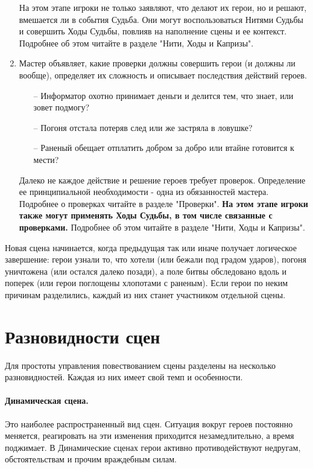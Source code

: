 \begin{enumerate}
\begin{itemize}
\end{itemize}
На этом этапе игроки не только заявляют, что делают их герои, но и решают, вмешается ли в события Судьба. Они могут воспользоваться Нитями Судьбы и совершить Ходы Судьбы, повлияв на наполнение сцены и ее контекст. Подробнее об этом читайте в разделе "Нити, Ходы и Капризы".
\item Мастер объявляет, какие проверки должны совершить герои (и должны ли вообще), определяет их сложность и описывает последствия действий героев.
\begin{itemize}
\item[--] Информатор охотно принимает деньги и делится тем, что знает, или зовет подмогу?
\item[--]  Погоня отстала потеряв след или же застряла в ловушке?
\item[--]  Раненый обещает отплатить добром за добро или втайне готовится к мести?
\end{itemize}
Далеко не каждое действие и решение героев требует проверок. Определение ее принципиальной необходимости - одна из обязанностей мастера. Подробнее о проверках читайте в разделе "Проверки".
\linebreak \textbf{На этом этапе игроки также могут применять Ходы Судьбы, в том числе связанные с проверками.} Подробнее об этом читайте в разделе "Нити, Ходы и Капризы".
\end{enumerate}
Новая сцена начинается, когда предыдущая так или иначе получает логическое завершение: герои узнали  то, что хотели (или бежали под градом ударов), погоня уничтожена (или остался далеко позади), а поле битвы обследовано вдоль и поперек (или герои поглощены хлопотами с раненым). Если герои по неким причинам разделились, каждый из них станет участником отдельной сцены.

\section{Разновидности сцен}
Для простоты управления повествованием сцены разделены на несколько разновидностей. Каждая из них имеет свой темп и особенности. 
\paragraph{Динамическая сцена.} Это наиболее распространенный вид сцен. Ситуация вокруг героев постоянно меняется, реагировать на эти изменения приходится незамедлительно, а время поджимает. В Динамические сценах герои активно противодействуют недругам, обстоятельствам и прочим враждебным силам. 
